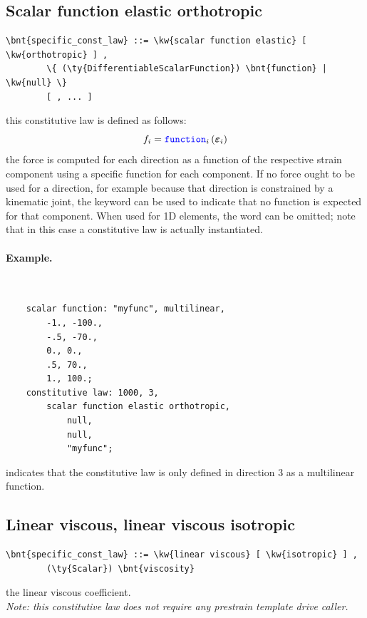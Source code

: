 \subsection{Scalar function elastic orthotropic}
\begin{Verbatim}[commandchars=\\\{\}]
    \bnt{specific_const_law} ::= \kw{scalar function elastic} [ \kw{orthotropic} ] ,
        \{ (\ty{DifferentiableScalarFunction}) \bnt{function} | \kw{null} \}
        [ , ... ]
\end{Verbatim}
this constitutive law is defined as follows:
\begin{displaymath}
	f_i = \textcolor{blue}{\texttt{function}}_i \left( \boldsymbol{\varepsilon}_i \right)
\end{displaymath}
the force is computed for each direction as a function of the respective
strain component using a specific function for each component.
If no force ought to be used for a direction, for example because 
that direction is constrained by a kinematic joint, the keyword 
can be used to indicate that no function is expected for that component.
When used for 1D elements, the word  can be omitted;
note that in this case a 
constitutive law is actually instantiated.

\paragraph{Example.} \
\begin{verbatim}
    scalar function: "myfunc", multilinear,
        -1., -100.,
        -.5, -70.,
        0., 0.,
        .5, 70.,
        1., 100.;
    constitutive law: 1000, 3,
        scalar function elastic orthotropic,
            null,
            null,
            "myfunc";
\end{verbatim}
indicates that the constitutive law is only defined in direction 3 
as a multilinear function.

\subsection{Linear viscous, linear viscous isotropic}
\begin{Verbatim}[commandchars=\\\{\}]
    \bnt{specific_const_law} ::= \kw{linear viscous} [ \kw{isotropic} ] , 
        (\ty{Scalar}) \bnt{viscosity}
\end{Verbatim}
the linear viscous coefficient. \\
{\em 
    Note: this constitutive law does not require any prestrain template
    drive caller.
}
  
